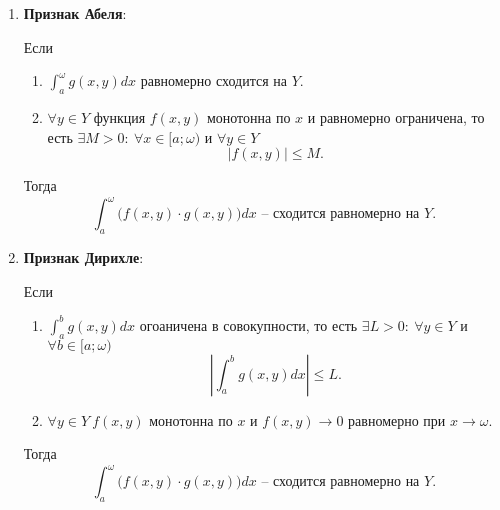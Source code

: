 \begin{theorem}\leavevmode
    \begin{enumerate}
        \item \textbf{Признак Абеля}:

              Если \begin{enumerate}
                  \item $\int_{a}^{\omega}g(x,y)dx$ равномерно сходится на $Y$.
                  \item $\forall y \in Y$ функция $f(x,y)$ монотонна по $x$ и равномерно ограничена, то есть $\exists M > 0: \ \forall x \in [a;\omega)$ и $\forall y \in Y$
                        \[
                            \left|f(x,y)\right| \leqslant M.
                        \]
              \end{enumerate}

              Тогда
              \[
                  \int_{a}^{\omega}\big(f(x,y) \cdot g(x,y)\big)dx \text{ -- сходится равномерно на }Y.
              \]

        \item \textbf{Признак Дирихле}:

              Если
              \begin{enumerate}
                  \item $\int_{a}^{b}g(x,y)dx$ огоаничена в совокупности, то есть $\exists L > 0: \ \forall y \in Y$ и $\forall b \in [a;\omega)$
                        \[
                            \left|\int_{a}^{b}g(x,y)dx\right| \leqslant L.
                        \]
                  \item $\forall y \in Y \ f(x,y)$ монотонна по $x$ и $f(x,y) \rightarrow 0$ равномерно при $x \rightarrow \omega$.
              \end{enumerate}

              Тогда
              \[
                  \int_{a}^{\omega}\big(f(x,y)\cdot g(x,y)\big)dx \text{ -- сходится равномерно на } Y.
              \]
    \end{enumerate}
\end{theorem}

